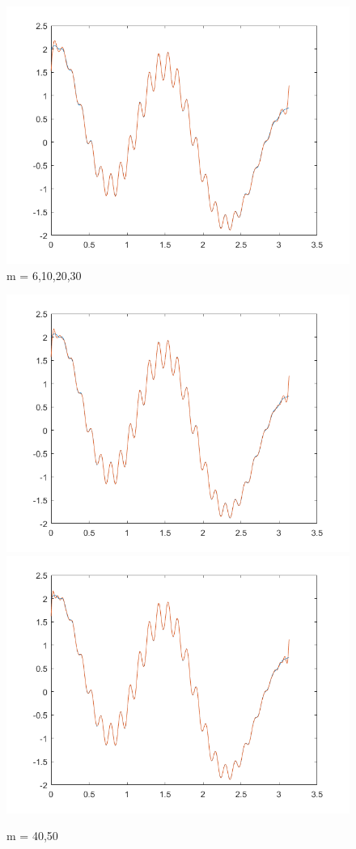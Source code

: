 \documentclass{article}
\begin{document}
\begin{figure}
	\includegraphics[scale=.5]{../res30.png}
	\caption{m = 6,10,20,30}
\end{figure}
\begin{figure}
	\includegraphics[scale=.5]{../res40.png}
	\includegraphics[scale=.5]{../res50.png}
	\caption{m = 40,50}
\end{figure}
\end{document}
